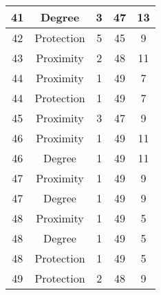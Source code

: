 \documentclass[results.tex]{subfiles}
\begin{document}
\begin{center}
\begin{tabular}{| c || c | c | c | c |}
            \hline
            41                      & Degree                       & 3                      & 47                      & 13                   \\
            \hline
            42                      & Protection                   & 5                      & 45                      & 9                    \\
            \hline
            43                      & Proximity                    & 2                      & 48                      & 11                   \\
            \hline
            44                      & Proximity                    & 1                      & 49                      & 7                    \\
            \hline
            44                      & Protection                   & 1                      & 49                      & 7                    \\
            \hline
            45                      & Proximity                    & 3                      & 47                      & 9                    \\
            \hline
            46                      & Proximity                    & 1                      & 49                      & 11                   \\
            \hline
            46                      & Degree                       & 1                      & 49                      & 11                   \\
            \hline
            47                      & Proximity                    & 1                      & 49                      & 9                    \\
            \hline
            47                      & Degree                       & 1                      & 49                      & 9                    \\
            \hline
            48                      & Proximity                    & 1                      & 49                      & 5                    \\
            \hline
            48                      & Degree                       & 1                      & 49                      & 5                    \\
            \hline
            48                      & Protection                   & 1                      & 49                      & 5                    \\
            \hline
            49                      & Protection                   & 2                      & 48                      & 9                    \\
            \hline
        \end{tabular}
    \end{center}
\end{document}
